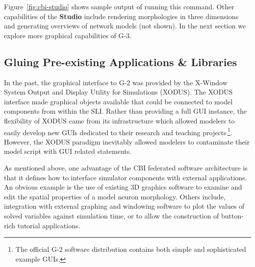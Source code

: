 \documentclass[12pt]{article}
\begin{document}
Figure~\ref{fig:cbi-studio} shows sample output of running this
command.  Other capabilities of the {\bf Studio} include rendering
morphologies in three dimensions and generating overviews of network
models (not shown).  In the next section we explore more graphical
capabilities of G-3.

\subsection{Gluing Pre-existing Applications \& Libraries}

In the past, the graphical interface to G-2 was provided by the
X-Window System Output and Display Utility for Simulations (XODUS).  The
XODUS interface made graphical objects available that could be
connected to model components from within the SLI.  Rather than
providing a full GUI instance, the flexibility of XODUS came from its
infrastructure which allowed modelers to easily develop new GUIs
dedicated to their research and teaching projects\,\footnote{The
  official G-2 software distribution contains both simple and
  sophisticated example GUIs.}.  However, the XODUS paradigm
inevitably allowed modelers to contaminate their model script with GUI
related statements.

As mentioned above, one advantage of the CBI federated software
architecture is that it defines how to interface simulator components
with external applications.  An obvious example is the use of existing
3D graphics software to examine and edit the spatial properties of a
model neuron morphology.  Others include, integration with external
graphing and windowing software to plot the values of solved
variables against simulation time, or to allow the construction of
button-rich tutorial applications.
\end{document}
